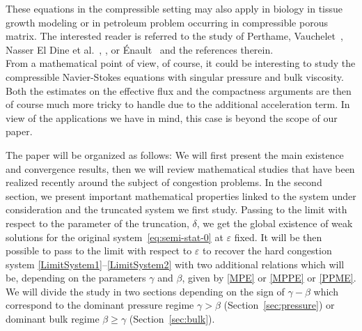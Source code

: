\documentclass[10pt]{amsart}
\newcommand{\<}{\bigl\langle}
\renewcommand{\>}{\bigr\rangle}
\theoremstyle{definition}
\theoremstyle{remark}
\let\ep\varepsilon
\begin{document}
These equations in the compressible setting may also apply in biology in tissue growth modeling or in petroleum problem occurring in compressible porous matrix. The interested reader is referred to the study of {Perthame}, {Vauchelet}~\cite{perthame2015}, {Nasser El Dine} et al.~\cite{Nasser2017}, \cite{nasser2019},
or {Énault}~\cite{Enault10} and the references therein.\\
From a mathematical point of view, of course, it could be interesting to study the compressible Navier-Stokes equations with singular pressure and bulk viscosity.
Both the estimates on the effective flux and the compactness arguments are then of course much more tricky to handle due to the additional acceleration term.
In view of the applications we have in mind, this case is beyond the scope of our paper.

The paper will be organized as follows: We will first present the main existence and convergence results,
then we will review mathematical studies that have been realized recently around the subject of congestion problems. In the second section, we present important mathematical
properties linked to the system under consideration and the truncated system we first study.
Passing to the limit with respect to the parameter of the truncation, $\delta$, we get the global existence of weak solutions for the original system~\eqref{eq:semi-stat-0} at $\ep$ fixed.
It will be then possible to pass to the limit with respect to $\varepsilon$ to recover the hard congestion system \eqref{LimitSystem1}--\eqref{LimitSystem2}
with two additional relations which will be, depending on the parameters $\gamma$ and $\beta$, given by \eqref{MPE} or \eqref{MPPE} or
\eqref{PPME}.
We will divide the study in two sections depending on the sign of $\gamma-\beta$ which correspond to the dominant pressure regime $\gamma > \beta$ (Section~\ref{sec:pressure}) or dominant bulk regime $\beta \ge \gamma$ (Section~\ref{sec:bulk}).
\end{document}
